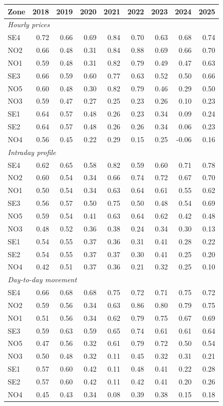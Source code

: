 \begin{tabular}{lrrrrrrrr}
\toprule
Zone & 2018 & 2019 & 2020 & 2021 & 2022 & 2023 & 2024 & 2025 \\
\midrule
\multicolumn{9}{l}{\textit{Hourly prices}} \\
SE4 & 0.72 & 0.66 & 0.69 & 0.84 & 0.70 & 0.63 & 0.68 & 0.74 \\
NO2 & 0.66 & 0.48 & 0.31 & 0.84 & 0.88 & 0.69 & 0.66 & 0.70 \\
NO1 & 0.59 & 0.48 & 0.31 & 0.82 & 0.79 & 0.49 & 0.47 & 0.63 \\
SE3 & 0.66 & 0.59 & 0.60 & 0.77 & 0.63 & 0.52 & 0.50 & 0.66 \\
NO5 & 0.60 & 0.48 & 0.30 & 0.82 & 0.79 & 0.46 & 0.29 & 0.50 \\
NO3 & 0.59 & 0.47 & 0.27 & 0.25 & 0.23 & 0.26 & 0.10 & 0.23 \\
SE1 & 0.64 & 0.57 & 0.48 & 0.26 & 0.23 & 0.34 & 0.09 & 0.24 \\
SE2 & 0.64 & 0.57 & 0.48 & 0.26 & 0.26 & 0.34 & 0.06 & 0.23 \\
NO4 & 0.56 & 0.45 & 0.22 & 0.29 & 0.15 & 0.25 & -0.06 & 0.16 \\
\midrule
\multicolumn{9}{l}{\textit{Intraday profile}} \\
SE4 & 0.62 & 0.65 & 0.58 & 0.82 & 0.59 & 0.60 & 0.71 & 0.78 \\
NO2 & 0.60 & 0.54 & 0.34 & 0.66 & 0.74 & 0.72 & 0.67 & 0.70 \\
NO1 & 0.50 & 0.54 & 0.34 & 0.63 & 0.64 & 0.61 & 0.55 & 0.62 \\
SE3 & 0.56 & 0.57 & 0.50 & 0.75 & 0.50 & 0.48 & 0.54 & 0.69 \\
NO5 & 0.59 & 0.54 & 0.41 & 0.63 & 0.64 & 0.62 & 0.42 & 0.48 \\
NO3 & 0.48 & 0.52 & 0.36 & 0.38 & 0.24 & 0.34 & 0.30 & 0.13 \\
SE1 & 0.54 & 0.55 & 0.37 & 0.36 & 0.31 & 0.41 & 0.28 & 0.22 \\
SE2 & 0.54 & 0.55 & 0.37 & 0.37 & 0.30 & 0.41 & 0.25 & 0.20 \\
NO4 & 0.42 & 0.51 & 0.37 & 0.36 & 0.21 & 0.32 & 0.25 & 0.10 \\
\midrule
\multicolumn{9}{l}{\textit{Day-to-day movement}} \\
SE4 & 0.66 & 0.68 & 0.68 & 0.75 & 0.72 & 0.71 & 0.75 & 0.72 \\
NO2 & 0.59 & 0.56 & 0.34 & 0.63 & 0.86 & 0.80 & 0.79 & 0.75 \\
NO1 & 0.51 & 0.56 & 0.34 & 0.62 & 0.79 & 0.75 & 0.67 & 0.69 \\
SE3 & 0.59 & 0.63 & 0.59 & 0.65 & 0.74 & 0.61 & 0.61 & 0.64 \\
NO5 & 0.47 & 0.56 & 0.32 & 0.61 & 0.79 & 0.72 & 0.50 & 0.54 \\
NO3 & 0.50 & 0.48 & 0.32 & 0.11 & 0.45 & 0.32 & 0.31 & 0.21 \\
SE1 & 0.57 & 0.60 & 0.42 & 0.11 & 0.48 & 0.41 & 0.22 & 0.28 \\
SE2 & 0.57 & 0.60 & 0.42 & 0.11 & 0.42 & 0.41 & 0.20 & 0.26 \\
NO4 & 0.45 & 0.43 & 0.34 & 0.08 & 0.39 & 0.38 & 0.15 & 0.18 \\
\bottomrule
\end{tabular}
